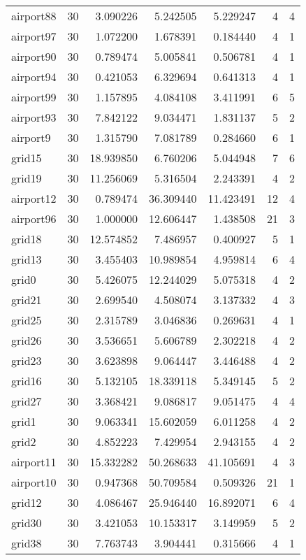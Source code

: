 \begin{longtable}{|l|r|r|r|r|r|r|}
airport88 & 30 & 3.090226 & 5.242505 & 5.229247 & 4 & 4 \\
airport97 & 30 & 1.072200 & 1.678391 & 0.184440 & 4 & 1 \\
airport90 & 30 & 0.789474 & 5.005841 & 0.506781 & 4 & 1 \\
airport94 & 30 & 0.421053 & 6.329694 & 0.641313 & 4 & 1 \\
airport99 & 30 & 1.157895 & 4.084108 & 3.411991 & 6 & 5 \\
airport93 & 30 & 7.842122 & 9.034471 & 1.831137 & 5 & 2 \\
airport9 & 30 & 1.315790 & 7.081789 & 0.284660 & 6 & 1 \\
grid15 & 30 & 18.939850 & 6.760206 & 5.044948 & 7 & 6 \\
grid19 & 30 & 11.256069 & 5.316504 & 2.243391 & 4 & 2 \\
airport12 & 30 & 0.789474 & 36.309440 & 11.423491 & 12 & 4 \\
airport96 & 30 & 1.000000 & 12.606447 & 1.438508 & 21 & 3 \\
grid18 & 30 & 12.574852 & 7.486957 & 0.400927 & 5 & 1 \\
grid13 & 30 & 3.455403 & 10.989854 & 4.959814 & 6 & 4 \\
grid0 & 30 & 5.426075 & 12.244029 & 5.075318 & 4 & 2 \\
grid21 & 30 & 2.699540 & 4.508074 & 3.137332 & 4 & 3 \\
grid25 & 30 & 2.315789 & 3.046836 & 0.269631 & 4 & 1 \\
grid26 & 30 & 3.536651 & 5.606789 & 2.302218 & 4 & 2 \\
grid23 & 30 & 3.623898 & 9.064447 & 3.446488 & 4 & 2 \\
grid16 & 30 & 5.132105 & 18.339118 & 5.349145 & 5 & 2 \\
grid27 & 30 & 3.368421 & 9.086817 & 9.051475 & 4 & 4 \\
grid1 & 30 & 9.063341 & 15.602059 & 6.011258 & 4 & 2 \\
grid2 & 30 & 4.852223 & 7.429954 & 2.943155 & 4 & 2 \\
airport11 & 30 & 15.332282 & 50.268633 & 41.105691 & 4 & 3 \\
airport10 & 30 & 0.947368 & 50.709584 & 0.509326 & 21 & 1 \\
grid12 & 30 & 4.086467 & 25.946440 & 16.892071 & 6 & 4 \\
grid30 & 30 & 3.421053 & 10.153317 & 3.149959 & 5 & 2 \\
grid38 & 30 & 7.763743 & 3.904441 & 0.315666 & 4 & 1 \\

\end{longtable}
